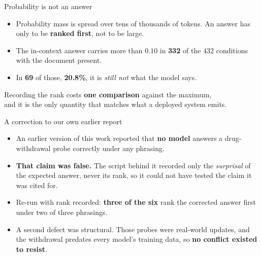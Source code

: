 \documentclass[aspectratio=169]{beamer}
\begin{document}
\begin{frame}{Probability is not an answer}
  \vspace{0.4cm}
  \begin{itemize}\setlength\itemsep{0.9em}
    \item Probability mass is spread over tens of thousands of tokens. An answer
          has only to be \textbf{ranked first}, not to be large.
    \item The in-context answer carries more than $0.10$ in \textbf{332} of the
          432 conditions with the document present.
    \item In \textbf{69} of those, \textbf{20.8\%}, it is \emph{still not} what
          the model says.
  \end{itemize}
  \vspace{1.2em}
  \begin{center}
    Recording the rank costs \textbf{one comparison} against the maximum,\\
    and it is the only quantity that matches what a deployed system emits.
  \end{center}
\end{frame}

\begin{frame}{A correction to our own earlier report}
  \vspace{0.4cm}
  \begin{itemize}\setlength\itemsep{0.85em}
    \item An earlier version of this work reported that \textbf{no model} answers
          a drug-withdrawal probe correctly under any phrasing.
    \item \textbf{That claim was false.} The script behind it recorded only the
          \emph{surprisal} of the expected answer, never its rank, so it could
          not have tested the claim it was cited for.
    \item Re-run with rank recorded: \textbf{three of the six} rank the corrected
          answer first under two of three phrasings.
    \item A second defect was structural. Those probes were real-world updates,
          and the withdrawal predates every model's training data, so \textbf{no
          conflict existed to resist}.
  \end{itemize}
\end{frame}
\end{document}
